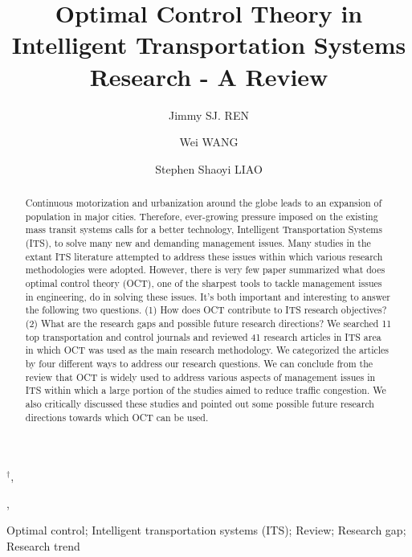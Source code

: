 \documentclass[12pt,onecolumn,twoside]{JCTA}
\theoremstyle{mystyle}
\begin{document}
                          \makeatletter
\def\@autr{{J. Ren} et al.}             \makeatother


\begin{frontmatter}                       
\title{Optimal Control Theory in Intelligent Transportation Systems Research - A Review}\footnotetext



\author[1]{Jimmy SJ. REN}$^{\dag}$,{ }
\author[1]{Wei WANG},{ }
\author[1]{Stephen Shaoyi LIAO}


\address[1]{.Department of Information Systems,
City University of Hong Kong, 83 Tat Chee Ave, Kowloon, Hong Kong SAR,
China}

\begin{keyword}
Optimal control; Intelligent transportation systems (ITS); Review; Research gap; Research trend
\end{keyword}


\begin{abstract}
Continuous motorization and urbanization around the globe leads to an expansion of population in major cities. Therefore, ever-growing pressure imposed on the existing mass transit systems calls for a better technology, Intelligent Transportation Systems (ITS), to solve many new and demanding management issues. Many studies in the extant ITS literature attempted to address these issues within which various research methodologies were adopted. However, there is very few paper summarized what does optimal control theory (OCT), one of the sharpest tools to tackle management issues in engineering, do in solving these issues. It{\textquoteright}s both important and interesting to answer the following two questions. (1) How does OCT contribute to ITS research objectives? (2) What are the research gaps and possible future research directions? We searched 11 top transportation and control journals and reviewed 41 research articles in ITS area in which OCT was used as the main research methodology. We categorized the articles by four different ways to address our research questions. We can conclude from the review that OCT is widely used to address various aspects of management issues in ITS within which a large portion of the studies aimed to reduce traffic congestion. We also critically discussed these studies and pointed out some possible future research directions towards which OCT can be used.
\end{abstract}

\end{frontmatter}
\end{document}
